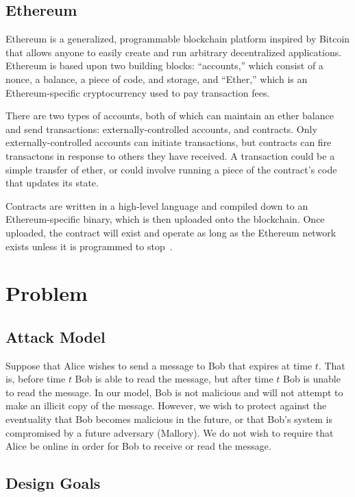 \documentclass{article}
\begin{document}
\subsection{Ethereum}

Ethereum is a generalized, programmable blockchain platform inspired by Bitcoin that allows anyone to easily create and run arbitrary decentralized applications. Ethereum is based upon two building blocks: ``accounts,'' which consist of a nonce, a balance, a piece of code, and storage, and ``Ether,'' which is an Ethereum-specific cryptocurrency used to pay transaction fees.

There are two types of accounts, both of which can maintain an ether balance and send  transactions: externally-controlled accounts, and contracts. Only externally-controlled accounts can initiate transactions, but contracts can fire transactons in response to others they have received. A transaction could be a simple transfer of ether, or could involve running a piece of the contract's code that updates its state.

Contracts are written in a high-level language and compiled down to an Ethereum-specific binary, which is then uploaded onto the blockchain. Once uploaded, the contract will exist and operate as long as the Ethereum network exists unless it is programmed to stop~\cite{ethereum-white}.

\section{Problem}

\subsection{Attack Model}

Suppose that Alice wishes to send a message to Bob that expires at time $t$. That is, before time $t$ Bob is able to read the message, but after time $t$ Bob is unable to read the message. In our model, Bob is not malicious and will not attempt to make an illicit copy of the message. However, we wish to protect against the eventuality that Bob becomes malicious in the future, or that Bob's system is compromised by a future adversary (Mallory). We do not wish to require that Alice be online in order for Bob to receive or read the message.

\subsection{Design Goals}
\end{document}

